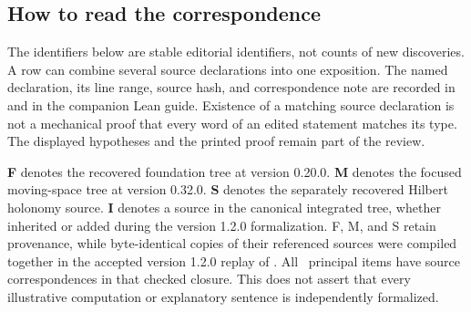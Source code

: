\subsection{How to read the correspondence}
The identifiers below are stable editorial identifiers, not counts of new discoveries. A row can combine several source declarations into one exposition. The named declaration, its line range, source hash, and correspondence note are recorded in  and in the companion Lean guide. Existence of a matching source declaration is not a mechanical proof that every word of an edited statement matches its type. The displayed hypotheses and the printed proof remain part of the review.

\textbf{F} denotes the recovered foundation tree at version 0.20.0. \textbf{M} denotes the focused moving-space tree at version 0.32.0. \textbf{S} denotes the separately recovered Hilbert holonomy source. \textbf{I} denotes a source in the canonical integrated tree, whether inherited or added during the version 1.2.0 formalization. F, M, and S retain provenance, while byte-identical copies of their referenced sources were compiled together in the accepted version 1.2.0 replay of . All \EditionClaims\ principal items have source correspondences in that checked closure. This does not assert that every illustrative computation or explanatory sentence is independently formalized.



